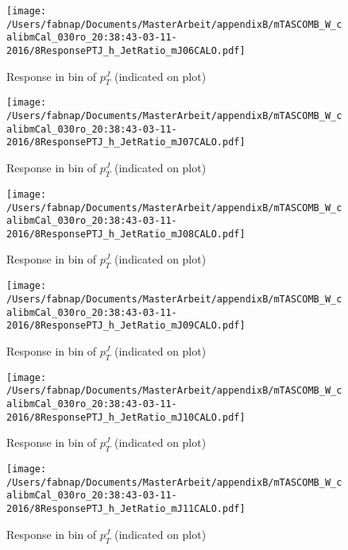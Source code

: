 \begin{figure}

\texttt{[image: /Users/fabnap/Documents/MasterArbeit/appendixB/mTASCOMB\_W\_calibmCal\_030ro\_20:38:43-03-11-2016/8ResponsePTJ\_h\_JetRatio\_mJ06CALO.pdf]}
\caption{Response in bin of  $p_{T}^{J}$ (indicated on plot)} 

\end{figure}

%
\begin{figure}

\texttt{[image: /Users/fabnap/Documents/MasterArbeit/appendixB/mTASCOMB\_W\_calibmCal\_030ro\_20:38:43-03-11-2016/8ResponsePTJ\_h\_JetRatio\_mJ07CALO.pdf]}
\caption{Response in bin of  $p_{T}^{J}$ (indicated on plot)} 

\end{figure}


\begin{figure}

\texttt{[image: /Users/fabnap/Documents/MasterArbeit/appendixB/mTASCOMB\_W\_calibmCal\_030ro\_20:38:43-03-11-2016/8ResponsePTJ\_h\_JetRatio\_mJ08CALO.pdf]}
\caption{Response in bin of  $p_{T}^{J}$ (indicated on plot)} 

\end{figure}

\begin{figure}

\texttt{[image: /Users/fabnap/Documents/MasterArbeit/appendixB/mTASCOMB\_W\_calibmCal\_030ro\_20:38:43-03-11-2016/8ResponsePTJ\_h\_JetRatio\_mJ09CALO.pdf]}
\caption{Response in bin of  $p_{T}^{J}$ (indicated on plot)} 

\end{figure}

\begin{figure}

\texttt{[image: /Users/fabnap/Documents/MasterArbeit/appendixB/mTASCOMB\_W\_calibmCal\_030ro\_20:38:43-03-11-2016/8ResponsePTJ\_h\_JetRatio\_mJ10CALO.pdf]}
\caption{Response in bin of  $p_{T}^{J}$ (indicated on plot)} 

\end{figure}

\begin{figure}

\texttt{[image: /Users/fabnap/Documents/MasterArbeit/appendixB/mTASCOMB\_W\_calibmCal\_030ro\_20:38:43-03-11-2016/8ResponsePTJ\_h\_JetRatio\_mJ11CALO.pdf]}
\caption{Response in bin of  $p_{T}^{J}$ (indicated on plot)} 

\end{figure}

